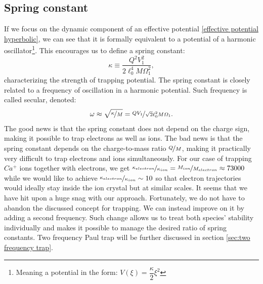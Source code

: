 \subsection{Spring constant}
\label{sec:spring constant}
If we focus on the dynamic component of an effective potential \eqref{effective potential hyperbolic}, we can see that it is formally equivalent to a potential of a harmonic oscillator\footnote{Meaning a potential in the form: $V(\xi) = \dfrac{\kappa}{2} \xi^2$}. This encourages us to define a spring constant: 
\begin{equation}
	\label{spring constant}
	\kappa \equiv \dfrac{Q^2 V_1^2}{2\ell_0^4 M \Omega_1^2},
\end{equation}
characterizing the strength of trapping potential. The spring constant is closely related to a frequency of oscillation in a harmonic potential. Such frequency is called secular, denoted: 
\begin{equation}
	\label{secular frequency}
	\omega \approx \sqrt{\nicefrac{\kappa}{M}} = \nicefrac{Q V_1}{\sqrt{2}\ell_0^2 M \Omega_1}.
\end{equation}
The good news is that the spring constant does not depend on the charge sign, making it possible to trap electrons as well as ions. The bad news is that the spring constant depends on the charge-to-mass ratio $\nicefrac{Q}{M}$, making it practically very difficult to trap electrons and ions simultaneously. For our case of trapping $Ca^+$ ions together with electrons, we get $\nicefrac{\kappa_{electron}}{\kappa_{ion}} = \nicefrac{M_{ion}}{M_{electron}} \approx 73000$ while we would like to achieve $\nicefrac{\kappa_{electron}}{\kappa_{ion}} \sim 10$ so that electron trajectories would ideally stay inside the ion crystal but at similar scales. It seems that we have hit upon a huge snag with our approach. Fortunately, we do not have to abandon the discussed concept for trapping. We can instead improve on it by adding a second frequency. Such change allows us to treat both species' stability individually and makes it possible to manage the desired ratio of spring constants. Two frequency Paul trap will be further discussed in section \ref{sec:two frequency trap}.

